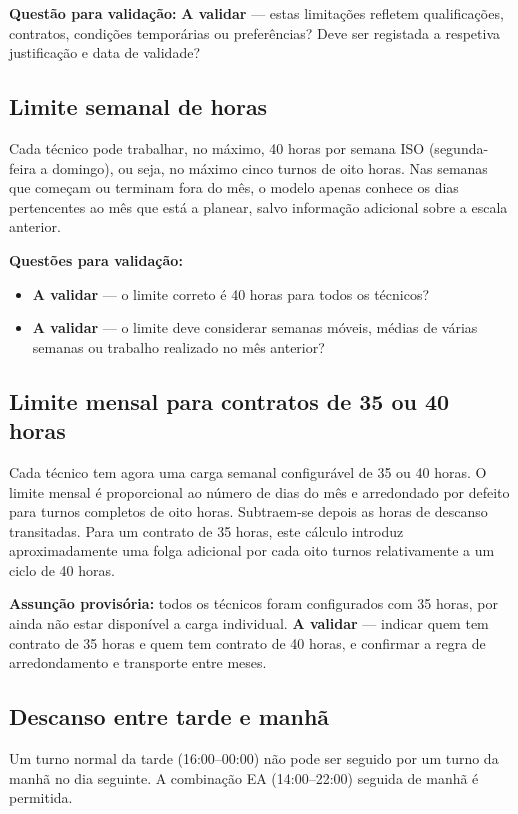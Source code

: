 \documentclass[11pt,a4paper]{article}
\newcommand{\validar}{\textcolor{blue!70!black}{\textbf{A validar}}}
\begin{document}
\textbf{Questão para validação:} \validar{} --- estas limitações refletem
qualificações, contratos, condições temporárias ou preferências? Deve ser
registada a respetiva justificação e data de validade?

\subsection{Limite semanal de horas}

Cada técnico pode trabalhar, no máximo, 40 horas por semana ISO (segunda-feira
a domingo), ou seja, no máximo cinco turnos de oito horas. Nas semanas que
começam ou terminam fora do mês, o modelo apenas conhece os dias pertencentes ao
mês que está a planear, salvo informação adicional sobre a escala anterior.

\textbf{Questões para validação:}
\begin{itemize}
    \item \validar{} --- o limite correto é 40 horas para todos os técnicos?
    \item \validar{} --- o limite deve considerar semanas móveis, médias de várias semanas ou trabalho realizado no mês anterior?
\end{itemize}

\subsection{Limite mensal para contratos de 35 ou 40 horas}

Cada técnico tem agora uma carga semanal configurável de 35 ou 40 horas. O
limite mensal é proporcional ao número de dias do mês e arredondado por defeito
para turnos completos de oito horas. Subtraem-se depois as horas de descanso
transitadas. Para um contrato de 35 horas, este cálculo introduz aproximadamente
uma folga adicional por cada oito turnos relativamente a um ciclo de 40 horas.

\textbf{Assunção provisória:} todos os técnicos foram configurados com 35 horas,
por ainda não estar disponível a carga individual. \validar{} --- indicar quem
tem contrato de 35 horas e quem tem contrato de 40 horas, e confirmar a regra de
arredondamento e transporte entre meses.

\subsection{Descanso entre tarde e manhã}

Um turno normal da tarde (16:00--00:00) não pode ser seguido por um turno da
manhã no dia seguinte. A combinação EA (14:00--22:00) seguida de manhã é
permitida.
\end{document}
